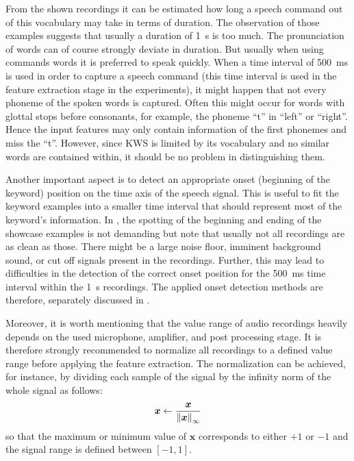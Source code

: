 \FloatBarrier
\noindent
From the shown recordings it can be estimated how long a speech command out of this vocabulary may take in terms of duration.
The observation of those examples suggests that usually a duration of \SI{1}{\second} is too much.
The pronunciation of words can of course strongly deviate in duration.
But usually when using commands words it is preferred to speak quickly.
When a time interval of \SI{500}{\milli\second} is used in order to capture a speech command (this time interval is used in the feature extraction stage in the experiments), it might happen that not every phoneme of the spoken words is captured.
Often this might occur for words with glottal stops before consonants, for example, the phoneme \enquote{t} in \enquote{left} or \enquote{right}.
Hence the input features may only contain information of the first phonemes and miss the \enquote{t}.
However, since KWS is limited by its vocabulary and no similar words are contained within, it should be no problem in distinguishing them.

Another important aspect is to detect an appropriate onset (beginning of the keyword) position on the time axis of the speech signal.
This is useful to fit the keyword examples into a smaller time interval that should represent most of the keyword's information.
In , the spotting of the beginning and ending of the showcase examples is not demanding but note that usually not all recordings are as clean as those.
There might be a large noise floor, imminent background sound, or cut off signals present in the recordings.
Further, this may lead to difficulties in the detection of the correct onset position for the \SI{500}{\milli\second} time interval within the \SI{1}{\second} recordings.
The applied onset detection methods are therefore, separately discussed in .

Moreover, it is worth mentioning that the value range of audio recordings heavily depends on the used microphone, amplifier, and post processing stage.
It is therefore strongly recommended to normalize all recordings to a defined value range before applying the feature extraction.
The normalization can be achieved, for instance, by dividing each sample of the signal by the infinity norm of the whole signal as follows:
\begin{equation}
  \bm{x} \gets \frac{\bm{x}}{\norm{\bm{x}}_\infty}
\end{equation}
so that the maximum or minimum value of $\bm{x}$ corresponds to either $+1$ or $-1$ and the signal range is defined between $[-1, 1]$.